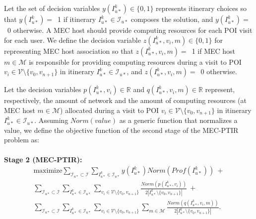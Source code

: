 Let the set of decision variables $y(I_{u*}^k) \in \{0, 1\}$ represents itinerary choices so that $y(I_{u*}^k)=$~1 if itinerary $I_{u*}^k \in \mathcal{I}_{u*}$ composes the solution, and $y(I_{u*}^k)=$~0 otherwise. A MEC host should provide computing resources for each POI visit for each user. We define the decision variable $z(I_{u*}^k,v_{i}, m) \in \{0, 1\}$ for representing MEC host association so that $ z(I_{u*}^k,v_{i},m)=$~1 if MEC host $m \in \mathcal{M}$ is responsible for providing computing resources during a visit to POI $v_{i} \in \mathcal{V} \setminus \{v_{0}, v_{n+1}\}$ in itinerary $I_{u*}^k \in \mathcal{I}_{u*}$, and $z(I_{u*}^k,v_{i},m)=$~0 otherwise. 

Let the decision variables $p(I_{u*}^k,v_{i}) \in \mathbb{R}$ and $q(I_{u*}^k,v_{i},m) \in \mathbb{R}$ represent, respectively, the amount of network and the amount of computing resources (at MEC host $m \in \mathcal{M}$) allocated during a visit to POI $v_{i} \in \mathcal{V} \setminus \{v_{0}, v_{n+1}\}$ in itinerary $I_{u*}^k \in \mathcal{I}_{u*}$. Assuming $Norm(value)$ as a generic function that normalizes a value, we define the objective function of the second stage of the MEC-PTIR problem as:\\
\\
\textbf{Stage 2 (MEC-PTIR):}
\begin{equation} \label{eq:stage2_summary}
\begin{split}
& \mathrm{maximize} \sum\limits_{\mathcal{I}_{u*} \subset \mathcal{I}}\sum\limits_{I_{u*}^k \in \mathcal{I}_{u*}}      y(I_{u*}^k)Norm(Prof(I_{u*}^k))\ +&\\
& \sum\limits_{\mathcal{I}_{u*} \subset \mathcal{I}}\sum\limits_{I_{u*}^k \in \mathcal{I}_{u*}}\sum\limits_{v_i \in \mathcal{V} \setminus \{v_{0}, v_{n+1}\}} \frac{Norm(p(I_{u*}^k,v_{i}))}{2|I_{u*}^k \setminus \{v_{0}, v_{n+1}\}|} \ +&\\
& \sum\limits_{\mathcal{I}_{u*} \subset \mathcal{I}}\sum\limits_{I_{u*}^k \in \mathcal{I}_{u*}}\sum\limits_{v_i \in \mathcal{V} \setminus \{v_{0}, v_{n+1}\}}\sum\limits_{m \in \mathcal{M}} \frac{Norm(q(I_{u*}^k,v_{i},m))}{2|I_{u*}^k \setminus \{v_{0}, v_{n+1}\}|}. &
\end{split}
\end{equation}

